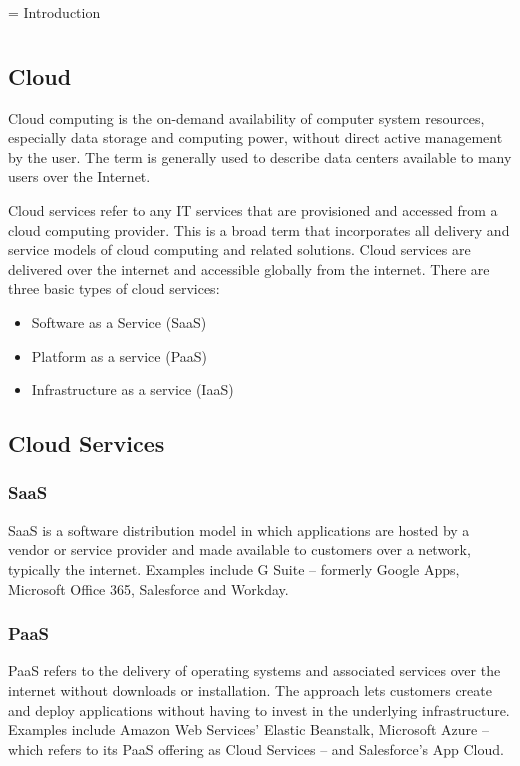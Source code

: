 \chapname = {Introduction}
\chapter{\the\chapname}

\hspace{3mm}

\section{Cloud}

Cloud computing is the on-demand availability of computer
system resources, especially data storage and computing power,
without direct active management by the user.
The term is generally used to describe data centers available
to many users over the Internet.

Cloud services refer to any IT services that are provisioned 
and accessed from a cloud computing provider. 
This is a broad term that incorporates all delivery and 
service models of cloud computing and related solutions. 
Cloud services are delivered over the internet and accessible globally from the internet. There are three basic types of cloud services:
\begin{itemize}
    \setlength\itemsep{-1em}
    \item Software as a Service (SaaS)
    \item Platform as a service (PaaS)
    \item Infrastructure as a service (IaaS)
\end{itemize}

\section{Cloud Services}

\subsection{SaaS}
SaaS is a software distribution model in which applications are hosted by a vendor or service provider and made available to customers over a network, typically the internet. Examples include G Suite -- formerly Google Apps, Microsoft Office 365, Salesforce and Workday.

\subsection{PaaS}
PaaS refers to the delivery of operating systems and associated services over the internet without downloads or installation. The approach lets customers create and deploy applications without having to invest in the underlying infrastructure. Examples include Amazon Web Services' Elastic Beanstalk, Microsoft Azure -- which refers to its PaaS offering as Cloud Services -- and Salesforce's App Cloud.

